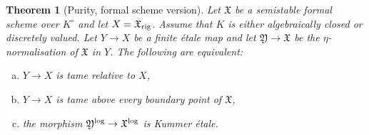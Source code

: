 \documentclass[a4paper,twoside,11pt,reqno]{amsart}
\newcommand{\fX}{{\mathfrak{X}}}
\newcommand{\fY}{{\mathfrak{Y}}}
\newtheorem{thm}{Theorem}[subsection]
\theoremstyle{definition}
\numberwithin{equation}{subsection}
\begin{document}
\begin{thm}[Purity, formal scheme version] \label{thm:Abhyankar-formal-more-precise}
  Let $\fX$ be a semistable formal scheme over $K^\circ$ and let $X=\fX_{\rm rig}$.  Assume that $K$ is either algebraically closed or discretely valued. 
 Let $Y\to X$ be a finite \'etale map and let $\fY\to \fX$ be the $\eta$-normalisation of $\fX$ in $Y$. The following are equivalent:
  \begin{enumerate}[(a)]
    \item \label{propitem:f-Abhy-tame} 
        $Y\to X$ is tame relative to $X$,
    \item \label{propitem:f-Abhy-tame-boundary}
        $Y\to X$ is tame above every boundary point of $\fX$, 
    \item \label{propitem:f-Abhy-ket}
        the morphism $\fY^{\rm log}\to\fX^{\rm log}$ is Kummer \'etale.
  \end{enumerate}
\end{thm}
\end{document}
